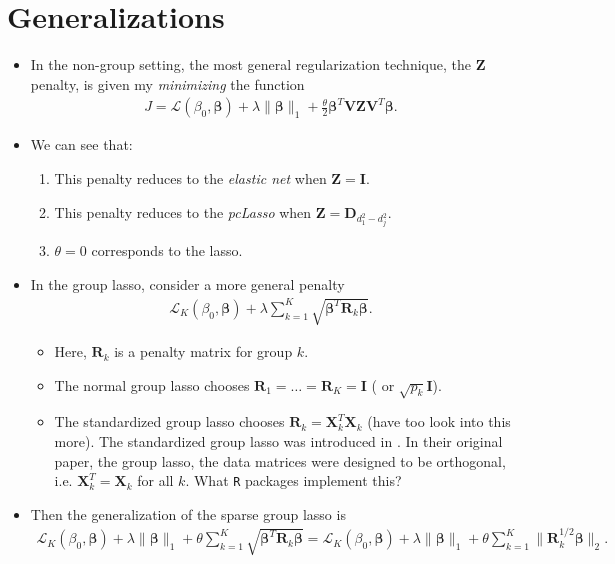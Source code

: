 \documentclass[10pt]{article}
\begin{document}
\section{Generalizations}
\begin{itemize}
    \item In the non-group setting, the most general regularization technique, the $\mathbf{Z}$ penalty, is given my \textit{minimizing} the function 
    \begin{align*}
        J = \mathcal{L}(\beta_0, \bm{\beta}) + \lambda \| \bm{\beta} \|_1 + \frac{\theta}{2} \bm{\beta}^T \mathbf{V} \mathbf{Z} \mathbf{V}^T \bm{\beta}.
    \end{align*}
    \item We can see that:
    \begin{enumerate}
        \item This penalty reduces to the \textit{elastic net} when $\mathbf{Z} = \mathbf{I}$.
        \item This penalty reduces to the \textit{pcLasso} when $\mathbf{Z} = \mathbf{D}_{d_1^2 - d_j^2}$.
        \item $\theta = 0$ corresponds to the lasso. 
    \end{enumerate}

    \item In the group lasso, \cite{yuan2006model} consider a more general penalty 
    \begin{align*}
        \mathcal{L}_K(\beta_0, \bm{\beta}) + \lambda \sum_{k=1}^K \sqrt{\bm{\beta}^T \mathbf{R}_k \bm{\beta}}.
    \end{align*}
    \begin{itemize}
        \item Here, $\mathbf{R}_k$ is a penalty matrix for group $k$.
        \item The normal group lasso chooses $\mathbf{R}_1 = \ldots = \mathbf{R}_K = \mathbf{I}$ ( or $\sqrt{p_k} \mathbf{I}$).
        \item The standardized group lasso chooses $\mathbf{R}_k = \mathbf{X}_k^T \mathbf{X}_k$ (have too look into this more). The standardized group lasso was introduced in \cite{simon2012standardization}. In their original paper, the group lasso, the data matrices were designed to be orthogonal, i.e. $\mathbf{X}_k^T = \mathbf{X}_k$ for all $k$. What \texttt{R} packages implement this?
    \end{itemize}
    \item Then the generalization of the sparse group lasso is 
    \begin{align*}
        \mathcal{L}_K(\beta_0, \bm{\beta}) + \lambda \| \bm{\beta} \|_1 + \theta \sum_{k=1}^K \sqrt{\bm{\beta}^T \mathbf{R}_k \bm{\beta}} = \mathcal{L}_K(\beta_0, \bm{\beta}) + \lambda \| \bm{\beta} \|_1 + \theta \sum_{k=1}^K \| \mathbf{R}_k^{1/2} \bm{\beta} \|_2.
    \end{align*}
\end{itemize}
\end{document}
